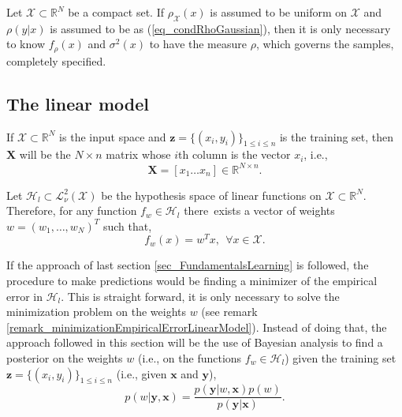   Let $\mathcal{X} \subset \mathbb{R}^N$ be a compact set. If $\rho_{\mathcal{X}}(x)$ is assumed to be uniform on $\mathcal{X}$ and $\rho(y|x)$ is assumed to be as (\ref{eq_condRhoGaussian}), then it is only necessary to know $f_{\rho}(x)$ and $\sigma^2(x)$ to have the measure $\rho$, which governs the samples, completely specified.



\subsection{The linear model} \label{sec_linearModel}

\begin{definition}
  If $\mathcal{X} \subset \mathbb{R}^N$ is the input space and $\pmb{z} = \{(x_i,y_i)\}_{1 \leq i \leq n}$ is the training set, then $\pmb{X}$ will be the $N \times n$ matrix whose $i$th column is the vector $x_i$, i.e.,
  \begin{equation*}
    \pmb{X} = [x_1 \hdots x_n] \in \mathbb{R}^{N \times n}.
  \end{equation*}  
\end{definition}

Let $\mathcal{H}_l \subset \mathcal{L}^2_{\nu}(\mathcal{X})$ be the hypothesis space of linear functions on $\mathcal{X} \subset \mathbb{R}^N$. Therefore, for any function $f_w \in  \mathcal{H}_l$ there exists a vector of weights $w = (w_1, \dots, w_N)^T$ such that,
\begin{equation*}
  f_w(x) = w^Tx, \ \ \forall x \in \mathcal{X}.
\end{equation*}

If the approach of last section \ref{sec_FundamentalsLearning} is followed, the procedure to make predictions would be finding a minimizer of the empirical error in $\mathcal{H}_l$. This is straight forward, it is only necessary to solve the minimization problem on the weights $w$ (see remark \ref{remark_minimizationEmpiricalErrorLinearModel}). Instead of doing that, the approach followed in this section will be the use of Bayesian analysis to find a posterior on the weights $w$ (i.e., on the functions $f_w \in \mathcal{H}_l$) given the training set $\pmb{z} = \{(x_i,y_i)\}_{1 \leq i \leq n}$ (i.e., given $\pmb{x}$ and $\pmb{y}$),
\begin{equation} \label{eq_bayesLinearModel}
  p(w | \pmb{y}, \pmb{x}) = \frac{p(\pmb{y}|w,\pmb{x}) p(w)}{p(\pmb{y}|\pmb{x})}.
\end{equation}


